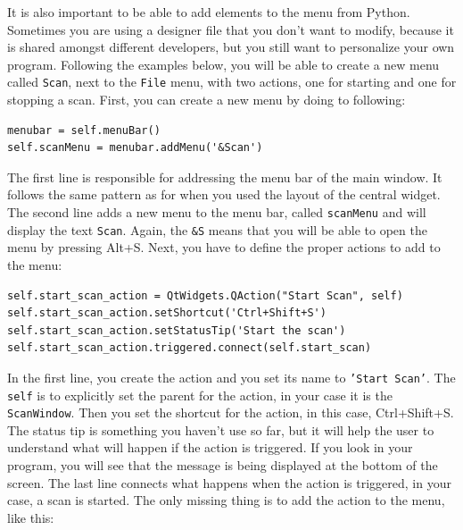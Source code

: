 
It is also important to be able to add elements to the menu from Python.
Sometimes you are using a designer file that you don't want to modify,
because it is shared amongst different developers, but you still want to
personalize your own program. Following the examples below, you will be
able to create a new menu called \texttt{Scan}, next to the
\texttt{File} menu, with two actions, one for starting and one for
stopping a scan. First, you can create a new menu by doing to following:

\begin{verbatim}
menubar = self.menuBar()
self.scanMenu = menubar.addMenu('&Scan')
\end{verbatim}

The first line is responsible for addressing the menu bar of the main
window. It follows the same pattern as for when you used the layout of
the central widget. The second line adds a new menu to the menu bar,
called \texttt{scanMenu} and will display the text \texttt{Scan}. Again,
the \texttt{&S} means that you will be able to open the menu by
pressing Alt+S. Next, you have to define the proper actions to add to
the menu:

\begin{verbatim}
self.start_scan_action = QtWidgets.QAction("Start Scan", self)
self.start_scan_action.setShortcut('Ctrl+Shift+S')
self.start_scan_action.setStatusTip('Start the scan')
self.start_scan_action.triggered.connect(self.start_scan)
\end{verbatim}

In the first line, you create the action and you set its name to \texttt{'Start
Scan'}. The \texttt{self} is to explicitly set the parent for the
action, in your case it is the \texttt{ScanWindow}. Then you set the
shortcut for the action, in this case, Ctrl+Shift+S. The status tip is
something you haven't use so far, but it will help the user to
understand what will happen if the action is triggered. If you look in
your program, you will see that the message is being displayed at the
bottom of the screen. The last line connects what happens when the
action is triggered, in your case, a scan is started. The only missing
thing is to add the action to the menu, like this:

